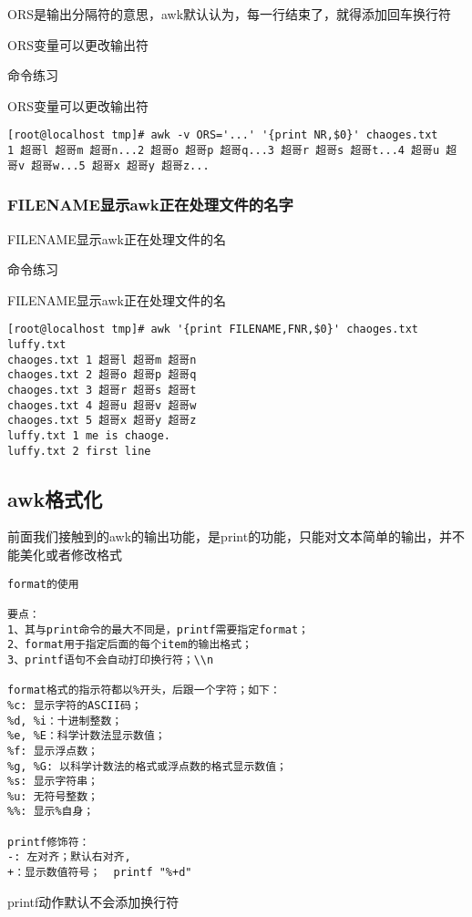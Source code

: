 ORS是输出分隔符的意思，awk默认认为，每一行结束了，就得添加回车换行符

ORS变量可以更改输出符
\begin{ascolorbox10}{命令练习}
	\begin{ascboxJ}{ORS变量可以更改输出符}
		\begin{lstlisting}[style=linux]
[root@localhost tmp]# awk -v ORS='...' '{print NR,$0}' chaoges.txt
1 超哥l 超哥m 超哥n...2 超哥o 超哥p 超哥q...3 超哥r 超哥s 超哥t...4 超哥u 超哥v 超哥w...5 超哥x 超哥y 超哥z...
		\end{lstlisting}
	\end{ascboxJ}
\end{ascolorbox10}

\subsubsection{FILENAME显示awk正在处理文件的名字}
FILENAME显示awk正在处理文件的名
\begin{ascolorbox10}{命令练习}
	\begin{ascboxJ}{FILENAME显示awk正在处理文件的名}
		\begin{lstlisting}[style=linux]
[root@localhost tmp]# awk '{print FILENAME,FNR,$0}' chaoges.txt  luffy.txt
chaoges.txt 1 超哥l 超哥m 超哥n
chaoges.txt 2 超哥o 超哥p 超哥q
chaoges.txt 3 超哥r 超哥s 超哥t
chaoges.txt 4 超哥u 超哥v 超哥w
chaoges.txt 5 超哥x 超哥y 超哥z
luffy.txt 1 me is chaoge.
luffy.txt 2 first line
		\end{lstlisting}
	\end{ascboxJ}
\end{ascolorbox10}
\subsection{awk格式化}
前面我们接触到的awk的输出功能，是{print}的功能，只能对文本简单的输出，并不能美化或者修改格式
		\begin{lstlisting}[style=linux]
format的使用

要点：
1、其与print命令的最大不同是，printf需要指定format；
2、format用于指定后面的每个item的输出格式；
3、printf语句不会自动打印换行符；\\n

format格式的指示符都以%开头，后跟一个字符；如下：
%c: 显示字符的ASCII码；
%d, %i：十进制整数；
%e, %E：科学计数法显示数值；
%f: 显示浮点数；
%g, %G: 以科学计数法的格式或浮点数的格式显示数值；
%s: 显示字符串；
%u: 无符号整数；
%%: 显示%自身；

printf修饰符：
-: 左对齐；默认右对齐,
+：显示数值符号；  printf "%+d"
\end{lstlisting}
printf动作默认不会添加换行符

